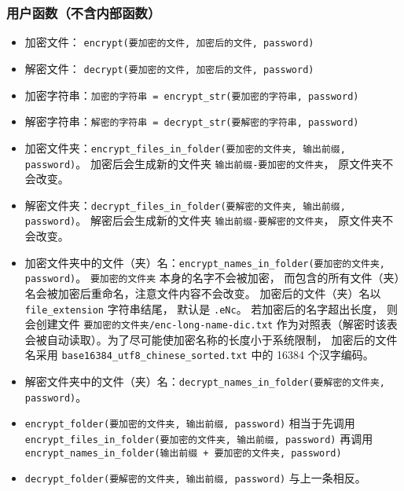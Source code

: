 \subsubsection{用户函数（不含内部函数）}
\begin{itemize}
\item 加密文件： \verb`encrypt(要加密的文件, 加密后的文件, password)`
\item 解密文件： \verb`decrypt(要加密的文件, 加密后的文件, password)`
\item 加密字符串：\verb`加密的字符串 = encrypt_str(要加密的字符串, password)`
\item 解密字符串：\verb`解密的字符串 = decrypt_str(要解密的字符串, password)`
\item 加密文件夹：\verb`encrypt_files_in_folder(要加密的文件夹, 输出前缀, password)`。 加密后会生成新的文件夹 \verb`输出前缀-要加密的文件夹`， 原文件夹不会改变。
\item 解密文件夹：\verb`decrypt_files_in_folder(要解密的文件夹, 输出前缀, password)`。 解密后会生成新的文件夹 \verb`输出前缀-要解密的文件夹`， 原文件夹不会改变。
\item 加密文件夹中的文件（夹）名：\verb`encrypt_names_in_folder(要加密的文件夹, password)`。 \verb`要加密的文件夹` 本身的名字不会被加密， 而包含的所有文件（夹）名会被加密后重命名，注意文件内容不会改变。 加密后的文件（夹）名以 \verb`file_extension` 字符串结尾， 默认是 \verb`.eNc`。 若加密后的名字超出长度， 则会创建文件 \verb`要加密的文件夹/enc-long-name-dic.txt` 作为对照表（解密时该表会被自动读取）。为了尽可能使加密名称的长度小于系统限制， 加密后的文件名采用 \verb`base16384_utf8_chinese_sorted.txt` 中的 16384 个汉字编码。
\item 解密文件夹中的文件（夹）名：\verb`decrypt_names_in_folder(要解密的文件夹, password)`。
\item \verb`encrypt_folder(要加密的文件夹, 输出前缀, password)` 相当于先调用 \verb`encrypt_files_in_folder(要加密的文件夹, 输出前缀, password)` 再调用 \verb`encrypt_names_in_folder(输出前缀 + 要加密的文件夹, password)`
\item \verb`decrypt_folder(要解密的文件夹, 输出前缀, password)` 与上一条相反。
\end{itemize}

